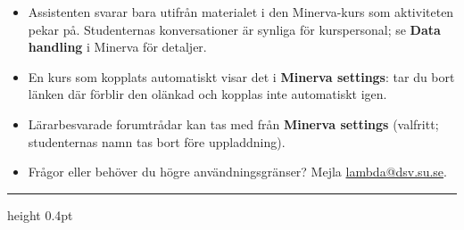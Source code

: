 \documentclass[11pt]{article}
\begin{document}
\begin{itemize}[leftmargin=1.4em,itemsep=4pt]
  \item Assistenten svarar bara utifrån materialet i den Minerva-kurs som
  aktiviteten pekar på. Studenternas konversationer är synliga för kurspersonal;
  se \textbf{Data handling} i Minerva för detaljer.
  \item En kurs som kopplats automatiskt visar det i \textbf{Minerva settings}:
  tar du bort länken där förblir den olänkad och kopplas inte automatiskt igen.
  \item Lärarbesvarade forumtrådar kan tas med från \textbf{Minerva settings}
  (valfritt; studenternas namn tas bort före uppladdning).
  \item Frågor eller behöver du högre användningsgränser? Mejla
  \href{mailto:lambda@dsv.su.se}{lambda@dsv.su.se}.
\end{itemize}

\vspace{1.2em}
\hrule height 0.4pt
\vspace{0.4em}
\end{document}
